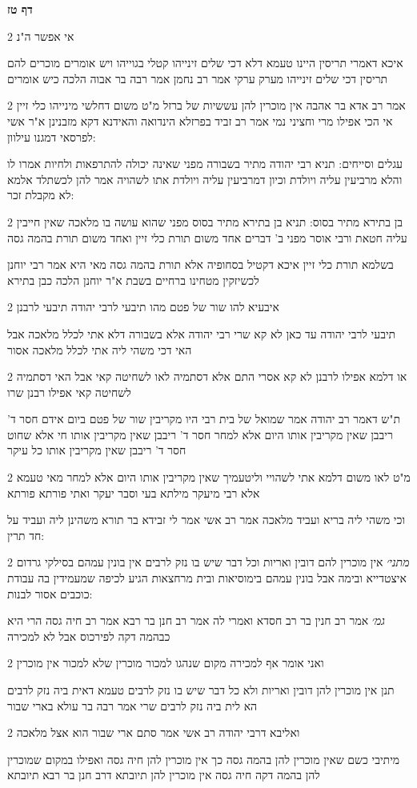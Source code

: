\documentclass[12pt, openany]{book}
\newcommand{\sethebfont}{
\fontsize{10.5pt}{21.0pt} \selectfont
}
\newcommand{\twocol}[1]{
	{\sethebfont \begin{multicols}{2}
			#1
	\end{multicols}}	
}
\newcommand{\sectname}{}
\newcommand{\newsection}[1]{
	\addcontentsline{toc}{section}{#1}
	\renewcommand{\sectname}{#1}	
	\vspace{-\baselineskip}
	\begin{center}
		\textbf{%
\fontsize{16pt}{16pt}\selectfont
			#1}
	\end{center}
	\vspace{-\baselineskip}
	\nopagebreak
}
\begin{document}
\newsection{דף טז}
\twocol{אי אפשר ה"נ
\par איכא דאמרי תריסין היינו טעמא דלא דכי שלים זינייהו קטלי בגוייהו ויש אומרים מוכרים להם תריסין דכי שלים זינייהו מערק ערקי אמר רב נחמן אמר רבה בר אבוה הלכה כיש אומרים}
\twocol{אמר רב אדא בר אהבה אין מוכרין להן עששיות של ברזל מ"ט משום דחלשי מינייהו כלי זיין אי הכי אפילו מרי וחציני נמי אמר רב זביד בפרזלא הינדואה והאידנא דקא מזבנינן א"ר אשי לפרסאי דמגנו עילוון:
\par עגלים וסייחים: תניא רבי יהודה מתיר בשבורה מפני שאינה יכולה להתרפאות ולחיות אמרו לו והלא מרביעין עליה ויולדת וכיון דמרביעין עליה ויולדת אתו לשהויה אמר להן לכשתלד אלמא לא מקבלת זכר:}
\twocol{בן בתירא מתיר בסוס: תניא בן בתירא מתיר בסוס מפני שהוא עושה בו מלאכה שאין חייבין עליה חטאת ורבי אוסר מפני ב' דברים אחד משום תורת כלי זיין ואחד משום תורת בהמה גסה
\par בשלמא תורת כלי זיין איכא דקטיל בסחופיה אלא תורת בהמה גסה מאי היא אמר רבי יוחנן לכשיזקין מטחינו ברחיים בשבת א"ר יוחנן הלכה כבן בתירא}
\twocol{איבעיא להו שור של פטם מהו תיבעי לרבי יהודה תיבעי לרבנן
\par תיבעי לרבי יהודה עד כאן לא קא שרי רבי יהודה אלא בשבורה דלא אתי לכלל מלאכה אבל האי דכי משהי ליה אתי לכלל מלאכה אסור}
\twocol{או דלמא אפילו לרבנן לא קא אסרי התם אלא דסתמיה לאו לשחיטה קאי אבל האי דסתמיה לשחיטה קאי אפילו רבנן שרו
\par ת"ש דאמר רב יהודה אמר שמואל של בית רבי היו מקריבין שור של פטם ביום אידם חסר ד' ריבבן שאין מקריבין אותו היום אלא למחר חסר ד' ריבבן שאין מקריבין אותו חי אלא שחוט חסר ד' ריבבן שאין מקריבין אותו כל עיקר}
\twocol{מ"ט לאו משום דלמא אתי לשהויי וליטעמיך שאין מקריבין אותו היום אלא למחר מאי טעמא אלא רבי מיעקר מילתא בעי וסבר יעקר ואתי פורתא פורתא
\par וכי משהי ליה בריא ועביד מלאכה אמר רב אשי אמר לי זבידא בר תורא משהינן ליה ועביד על חד תרין:}
\twocol{{\large\emph{מתני׳}} אין מוכרין להם דובין ואריות וכל דבר שיש בו נזק לרבים אין בונין עמהם בסילקי גרדום איצטדייא ובימה אבל בונין עמהם בימוסיאות ובית מרחצאות הגיע לכיפה שמעמידין בה עבודת כוכבים אסור לבנות:
\par {\large\emph{גמ׳}} אמר רב חנין בר רב חסדא ואמרי לה אמר רב חנן בר רבא אמר רב חיה גסה הרי היא כבהמה דקה לפירכוס אבל לא למכירה}
\twocol{ואני אומר אף למכירה מקום שנהגו למכור מוכרין שלא למכור אין מוכרין
\par תנן אין מוכרין להן דובין ואריות ולא כל דבר שיש בו נזק לרבים טעמא דאית ביה נזק לרבים הא לית ביה נזק לרבים שרי אמר רבה בר עולא בארי שבור}
\twocol{ואליבא דרבי יהודה רב אשי אמר סתם ארי שבור הוא אצל מלאכה
\par מיתיבי כשם שאין מוכרין להן בהמה גסה כך אין מוכרין להן חיה גסה ואפילו במקום שמוכרין להן בהמה דקה חיה גסה אין מוכרין להן תיובתא דרב חנן בר רבא תיובתא}
\end{document}
